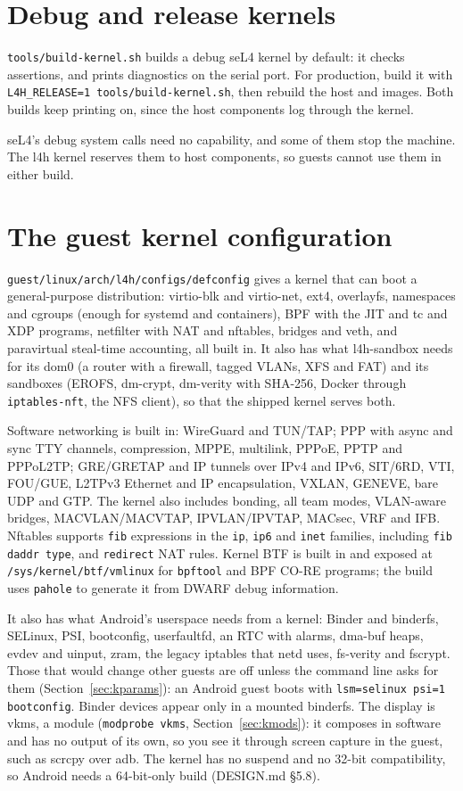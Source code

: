 \documentclass[11pt,a4paper]{report}
\newcommand{\cmd}[1]{\texttt{#1}}
\newcommand{\file}[1]{\texttt{#1}}
\begin{document}
\section{Debug and release kernels}

\cmd{tools/build-kernel.sh} builds a debug seL4 kernel by default: it checks
assertions, and prints diagnostics on the serial port. For production, build
it with \texttt{L4H\_RELEASE=1 tools/build-kernel.sh}, then rebuild the host
and images. Both builds keep printing on, since the host components log
through the kernel.

seL4's debug system calls need no capability, and some of them stop the
machine. The l4h kernel reserves them to host components, so guests cannot
use them in either build.

\section{The guest kernel configuration}

\file{guest/linux/arch/l4h/configs/defconfig} gives a kernel that can boot a
general-purpose distribution: virtio-blk and virtio-net, ext4, overlayfs,
namespaces and cgroups (enough for systemd and containers), BPF with the
JIT and tc and XDP programs, netfilter
with NAT and nftables, bridges and veth, and paravirtual steal-time
accounting, all built in. It also has what l4h-sandbox needs for its dom0 (a
router with a firewall, tagged VLANs, XFS and FAT) and its sandboxes
(EROFS, dm-crypt, dm-verity with SHA-256, Docker through
\texttt{iptables-nft}, the NFS client), so that the shipped kernel serves
both.

Software networking is built in: WireGuard and TUN/TAP; PPP with async and
sync TTY channels, compression, MPPE, multilink, PPPoE, PPTP and PPPoL2TP;
GRE/GRETAP and IP tunnels over IPv4 and IPv6, SIT/6RD, VTI, FOU/GUE,
L2TPv3 Ethernet and IP encapsulation, VXLAN, GENEVE, bare UDP and GTP.
The kernel also includes bonding, all team modes, VLAN-aware bridges,
MACVLAN/MACVTAP, IPVLAN/IPVTAP, MACsec, VRF and IFB.
Nftables supports \texttt{fib} expressions in the \texttt{ip}, \texttt{ip6}
and \texttt{inet} families, including \texttt{fib daddr type}, and
\texttt{redirect} NAT rules.
Kernel BTF is built in and exposed at \file{/sys/kernel/btf/vmlinux} for
\texttt{bpftool} and BPF CO-RE programs; the build uses \texttt{pahole}
to generate it from DWARF debug information.

It also has what Android's userspace needs from a kernel: Binder and
binderfs, SELinux, PSI, bootconfig, userfaultfd, an RTC with alarms,
dma-buf heaps, evdev and uinput, zram, the legacy iptables that netd uses,
fs-verity and fscrypt. Those that would change other guests are off unless
the command line asks for them (Section~\ref{sec:kparams}): an Android
guest boots with \texttt{lsm=selinux psi=1 bootconfig}. Binder devices
appear only in a mounted binderfs. The display is vkms, a module
(\texttt{modprobe vkms}, Section~\ref{sec:kmods}): it composes in
software and has no output of its own, so you see it through screen
capture in the guest, such as scrcpy over adb. The kernel has no suspend
and no 32-bit compatibility, so Android needs a 64-bit-only build
(DESIGN.md \S5.8).
\end{document}

